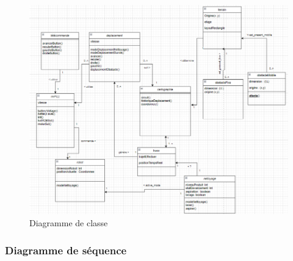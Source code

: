 \begin{figure}[H]
    \center
    \includegraphics[scale=0.5]{data/diag_class.png}
    \caption{Diagramme de classe}
    \label{fig:diagramme_classe}
\end{figure}

\subsubsection{Diagramme de séquence}